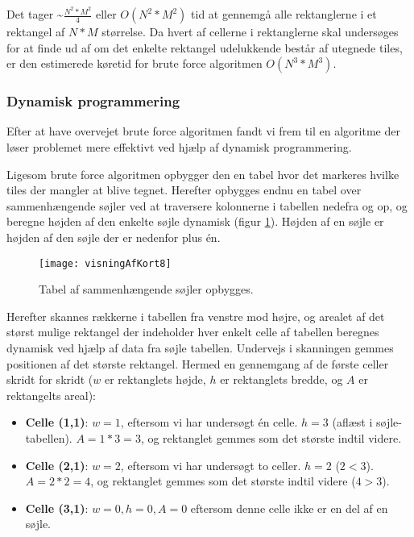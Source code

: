 Det tager \textasciitilde$\frac{N^2 * M^2}{4}$ eller $O(N^2 * M^2)$ tid at gennemgå alle rektanglerne i et rektangel af $N * M$ størrelse. Da hvert af cellerne i rektanglerne skal undersøges for at finde ud af om det enkelte rektangel udelukkende består af utegnede tiles, er den estimerede køretid for brute force algoritmen $O(N^3 * M^3)$.

\subsubsection{Dynamisk programmering}
\label{subsec:dynamiskProgrammering}

Efter at have overvejet brute force algoritmen fandt vi frem til en algoritme der løser problemet mere effektivt ved hjælp af dynamisk programmering. 

Ligesom brute force algoritmen opbygger den en tabel hvor det markeres hvilke tiles der mangler at blive tegnet. Herefter opbygges endnu en tabel over sammenhængende søjler ved at traversere kolonnerne i tabellen nedefra og op, og beregne højden af den enkelte søjle dynamisk (figur \ref{figur:visningAfKort8}). Højden af en søjle er højden af den søjle der er nedenfor plus én.

\begin{figure}[h]
	\centering
	\texttt{[image: visningAfKort8]}
	\captionsetup{width=0.8\textwidth}
	\caption{Tabel af sammenhængende søjler opbygges.}
	\label{figur:visningAfKort8}
\end{figure}

Herefter skannes rækkerne i tabellen fra venstre mod højre, og arealet af det størst mulige rektangel der indeholder hver enkelt celle af tabellen beregnes dynamisk ved hjælp af data fra søjle tabellen. Undervejs i skanningen gemmes positionen af det største rektangel. Hermed en gennemgang af de første celler skridt for skridt ($w$ er rektanglets højde, $h$ er rektanglets bredde, og $A$ er rektangelts areal):

\begin{itemize}
	\item \textbf{Celle (1,1)}: $w = 1$, eftersom vi har undersøgt én celle. $h = 3$ (aflæst i søjle-tabellen). $A = 1 * 3 = 3$, og rektanglet gemmes som det største indtil videre.
	\item \textbf{Celle (2,1)}: $w = 2$, eftersom vi har undersøgt to celler. $h = 2$ ($2 < 3$). $A = 2 * 2 = 4$, og rektanglet gemmes som det største indtil videre ($4 > 3$).
	\item \textbf{Celle (3,1)}: $w = 0, h = 0, A = 0$ eftersom denne celle ikke er en del af en søjle.
\end{itemize}

